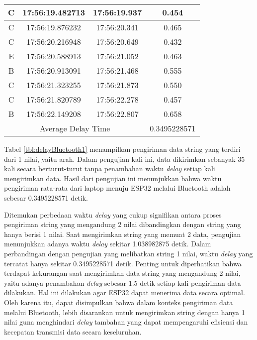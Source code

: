 \begin{longtable}{|ccc|c|}
  \multicolumn{1}{|c|}{C}    & \multicolumn{1}{c|}{17:56:19.482713} & 17:56:19.937       & 0.454        \\ \hline
  \multicolumn{1}{|c|}{C}    & \multicolumn{1}{c|}{17:56:19.876232} & 17:56:20.341       & 0.465        \\ \hline
  \multicolumn{1}{|c|}{C}    & \multicolumn{1}{c|}{17:56:20.216948} & 17:56:20.649       & 0.432        \\ \hline
  \multicolumn{1}{|c|}{E}    & \multicolumn{1}{c|}{17:56:20.588913} & 17:56:21.052       & 0.463        \\ \hline
  \multicolumn{1}{|c|}{B}    & \multicolumn{1}{c|}{17:56:20.913091} & 17:56:21.468       & 0.555        \\ \hline
  \multicolumn{1}{|c|}{C}    & \multicolumn{1}{c|}{17:56:21.323255} & 17:56:21.873       & 0.550        \\ \hline
  \multicolumn{1}{|c|}{C}    & \multicolumn{1}{c|}{17:56:21.820789} & 17:56:22.278       & 0.457        \\ \hline
  \multicolumn{1}{|c|}{B}    & \multicolumn{1}{c|}{17:56:22.149208} & 17:56:22.807       & 0.658        \\ \hline
  \multicolumn{3}{|c|}{Average Delay Time}                                               & 0.3495228571 \\ \hline
\end{longtable}

Tabel \ref{tbl:delayBluetooth1} menampilkan pengiriman data string yang terdiri dari 1 nilai, yaitu arah. Dalam pengujian kali ini, data dikirimkan sebanyak 35 kali secara berturut-turut tanpa penambahan waktu \emph{delay} setiap kali mengirimkan data. Hasil dari pengujian ini menunjukkan bahwa waktu pengiriman rata-rata dari laptop menuju ESP32 melalui Bluetooth adalah sebesar 0.3495228571 detik.

Ditemukan perbedaan waktu \emph{delay} yang cukup signifikan antara proses pengiriman string yang mengandung 2 nilai dibandingkan dengan string yang hanya berisi 1 nilai. Saat mengirimkan string yang memuat 2 data, pengujian menunjukkan adanya waktu \emph{delay} sekitar 1.038982875 detik. Dalam perbandingan dengan pengujian yang melibatkan string 1 nilai, waktu \emph{delay} yang tercatat hanya sekitar 0.3495228571 detik. Penting untuk diperhatikan bahwa terdapat kekurangan saat mengirimkan data string yang mengandung 2 nilai, yaitu adanya penambahan \emph{delay} sebesar 1.5 detik setiap kali pengiriman data dilakukan. Hal ini dilakukan agar ESP32 dapat menerima data secara optimal. Oleh karena itu, dapat disimpulkan bahwa dalam konteks pengiriman data melalui Bluetooth, lebih disarankan untuk mengirimkan string dengan hanya 1 nilai guna menghindari \emph{delay} tambahan yang dapat mempengaruhi efisiensi dan kecepatan transmisi data secara keseluruhan.

